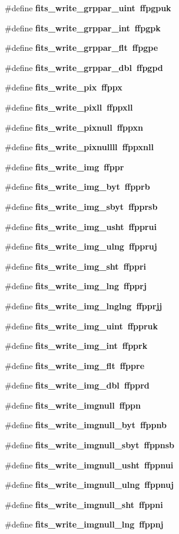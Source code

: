 \begin{CompactItemize}
\#define \bf{fits\_\-write\_\-grppar\_\-uint}~ffpgpuk
\item 
\#define \bf{fits\_\-write\_\-grppar\_\-int}~ffpgpk
\item 
\#define \bf{fits\_\-write\_\-grppar\_\-flt}~ffpgpe
\item 
\#define \bf{fits\_\-write\_\-grppar\_\-dbl}~ffpgpd
\item 
\#define \bf{fits\_\-write\_\-pix}~ffppx
\item 
\#define \bf{fits\_\-write\_\-pixll}~ffppxll
\item 
\#define \bf{fits\_\-write\_\-pixnull}~ffppxn
\item 
\#define \bf{fits\_\-write\_\-pixnullll}~ffppxnll
\item 
\#define \bf{fits\_\-write\_\-img}~ffppr
\item 
\#define \bf{fits\_\-write\_\-img\_\-byt}~ffpprb
\item 
\#define \bf{fits\_\-write\_\-img\_\-sbyt}~ffpprsb
\item 
\#define \bf{fits\_\-write\_\-img\_\-usht}~ffpprui
\item 
\#define \bf{fits\_\-write\_\-img\_\-ulng}~ffppruj
\item 
\#define \bf{fits\_\-write\_\-img\_\-sht}~ffppri
\item 
\#define \bf{fits\_\-write\_\-img\_\-lng}~ffpprj
\item 
\#define \bf{fits\_\-write\_\-img\_\-lnglng}~ffpprjj
\item 
\#define \bf{fits\_\-write\_\-img\_\-uint}~ffppruk
\item 
\#define \bf{fits\_\-write\_\-img\_\-int}~ffpprk
\item 
\#define \bf{fits\_\-write\_\-img\_\-flt}~ffppre
\item 
\#define \bf{fits\_\-write\_\-img\_\-dbl}~ffpprd
\item 
\#define \bf{fits\_\-write\_\-imgnull}~ffppn
\item 
\#define \bf{fits\_\-write\_\-imgnull\_\-byt}~ffppnb
\item 
\#define \bf{fits\_\-write\_\-imgnull\_\-sbyt}~ffppnsb
\item 
\#define \bf{fits\_\-write\_\-imgnull\_\-usht}~ffppnui
\item 
\#define \bf{fits\_\-write\_\-imgnull\_\-ulng}~ffppnuj
\item 
\#define \bf{fits\_\-write\_\-imgnull\_\-sht}~ffppni
\item 
\#define \bf{fits\_\-write\_\-imgnull\_\-lng}~ffppnj
\item 

\end{CompactItemize}
